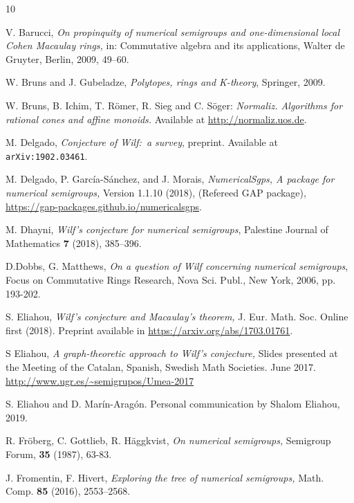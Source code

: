\documentclass[12pt]{amsart}
\theoremstyle{definition}
\numberwithin{equation}{section}
\renewcommand\>{\rangle}
\newcommand\<{\langle}
\newcommand\0{\mathbf{0}}
\begin{document}
\begin{thebibliography}{10}%

 V. Barucci, \emph{On propinquity of numerical semigroups and one-dimensional
local Cohen Macaulay rings,} in: Commutative algebra and its applications, Walter
de Gruyter, Berlin, 2009,  49--60.

 W. Bruns and J. Gubeladze, \emph{Polytopes, rings and K-theory},  Springer, 2009.

 W. Bruns, B. Ichim, T. R\"omer, R. Sieg and C. S\"oger:
\emph{Normaliz. Algorithms for rational cones and affine monoids.}
Available at \url{http://normaliz.uos.de}.

 M. Delgado, \emph{Conjecture of Wilf:\ a survey}, preprint.  Available at \texttt{arXiv:1902.03461}. 

M. Delgado, P. Garc\'ia-S\'anchez, and J. Morais, \emph{NumericalSgps, A package  for  numerical semigroups,} Version 1.1.10 (2018), (Refereed GAP package), \url{https://gap-packages.github.io/numericalsgps}.

 M. Dhayni, \emph{Wilf’s conjecture for numerical semigroups}, Palestine Journal of Mathematics \textbf{7} (2018), 385--396.

 D.Dobbs, G. Matthews, \emph{On a question of Wilf concerning numerical semigroups}, Focus on Commutative Rings Research, Nova Sci. Publ., New York, 2006, pp. 193-202.

 S. Eliahou, \emph{Wilf's conjecture and Macaulay's theorem,} J. Eur. Math.
Soc. Online first (2018). Preprint available in \url{https://arxiv.org/abs/1703.01761}.

 S Eliahou, \emph{A graph-theoretic approach to Wilf’s conjecture,} Slides presented at the Meeting of the Catalan, Spanish, Swedish Math Societies. June 2017. \url{http://www.ugr.es/~semigrupos/Umea-2017}

 S. Eliahou and D. Marín-Aragón. Personal communication by Shalom
Eliahou, 2019.

 R. Fr\"oberg, C. Gottlieb, R. H\"aggkvist, \emph{On numerical
semigroups,} Semigroup Forum, {\bf 35} (1987), 63-83.

 J. Fromentin, F. Hivert, \emph{Exploring the tree of numerical semigroups,}
Math. Comp. \textbf{85} (2016), 2553--2568.


\end{thebibliography}
\end{document}
